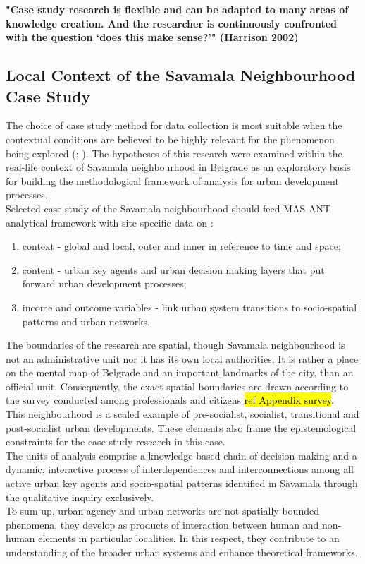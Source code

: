 \documentclass[11pt]{report}
\begin{document}
\textbf{"Case study research is flexible and can be adapted to many areas of knowledge creation. And the researcher is continuously confronted with the question ‘does this make sense?’" (Harrison 2002)}

\subsection{Local Context of the Savamala Neighbourhood Case Study}

The choice of case study method for data collection is most suitable when the  contextual  conditions  are  believed  to  be highly relevant for the phenomenon being explored (\cite{Robson, 1993}; \cite{Yin, 1994}). The hypotheses of this research were examined within the real-life context of Savamala neighbourhood in Belgrade as an exploratory basis for building the methodological framework of analysis for urban development processes. 
\\
Selected case study of the Savamala neighbourhood  should feed MAS-ANT analytical framework with site-specific data on :
\begin{enumerate}
\item context - global and local, outer and inner in reference to time and space;
\item content - urban key agents and urban decision making layers that put forward urban development processes;
\item income and outcome variables - link urban system transitions to socio-spatial patterns and urban networks.
\end{enumerate}

The boundaries of the research are spatial, though Savamala neighbourhood is not an administrative unit nor it has its own local authorities. It is rather a place on the mental map of Belgrade and an important landmarks of the city, than an official unit. Consequently, the exact spatial boundaries are drawn according to the survey conducted among professionals and citizens \hl{ref Appendix survey}.
\\
This neighbourhood is a scaled example of pre-socialist, socialist, transitional and post-socialist urban developments. These elements also frame the epistemological constraints for the case study research in this case.
\\
The units of analysis comprise a knowledge-based chain of decision-making and a dynamic, interactive process of interdependences and interconnections among all active urban key agents and socio-spatial patterns identified in Savamala through the qualitative inquiry exclusively.
\\
To sum up, urban agency and urban networks are not spatially bounded phenomena, they develop as products of interaction between human and non-human elements in particular localities. In this respect, they contribute to an understanding of the broader urban systems and enhance theoretical frameworks. 
\end{document}
